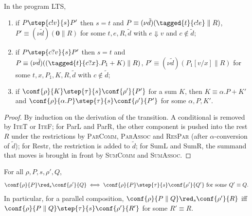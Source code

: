 \begin{lemma}\label{lem:shapes}
In the program LTS,
\begin{enumerate}
\item if $P \step{c!v}{s} P'$ then $s = t$ and
  $P \equiv (\nu \tilde d)(\tagged{t}{c!e} \parallel R)$,
  $P' \equiv (\nu \tilde d)(\mathbf{0} \parallel R)$ for some $t, e, R, \tilde d$
  with $e \Downarrow v$ and $c \notin \tilde d$;
\item if $P \step{c?v}{s} P'$ then $s = t$ and
  $P \equiv (\nu \tilde d)((\tagged{t}{c?x}.P_1 + K) \parallel R)$,
  $P' \equiv (\nu \tilde d)(P_1[v/x] \parallel R)$ for some
  $t, x, P_1, K, R, \tilde d$ with $c \notin \tilde d$;
\item if $\conf{\rho}{K} \step{\tau}{s} \conf{\rho'}{P'}$ for a sum $K$, then
  $K \equiv \alpha.P + K'$ and
  $\conf{\rho}{\alpha.P} \step{\tau}{s} \conf{\rho'}{P'}$ for some
  $\alpha, P, K'$.
\end{enumerate}
\end{lemma}

\begin{proof}
By induction on the derivation of the transition. A conditional is removed by
\textsc{IteT} or \textsc{IteF}; for ParL and ParR, the other component is
pushed into the rest $R$ under the restrictions by \textsc{ParComm},
\textsc{ParAssoc} and \textsc{ResPar} (after $\alpha$-conversion of $\tilde d$);
for Restr, the restriction is added to $\tilde d$; for SumL and SumR, the
summand that moves is brought in front by \textsc{SumComm} and
\textsc{SumAssoc}.
\end{proof}

\begin{lemma}[Harmony]\label{lem:harmony}
For all $\rho, P, s, \rho', Q$,
\[
\conf{\rho}{P} \red_{s} \conf{\rho'}{Q}
\iff
\conf{\rho}{P} \step{\tau}{s} \conf{\rho'}{Q'} \text{ for some } Q' \equiv Q.
\]
In particular, for a parallel composition,
$\conf{\rho}{P \parallel Q} \red_{s} \conf{\rho'}{R}$ iff
$\conf{\rho}{P \parallel Q} \step{\tau}{s} \conf{\rho'}{R'}$ for some
$R' \equiv R$.
\end{lemma}

